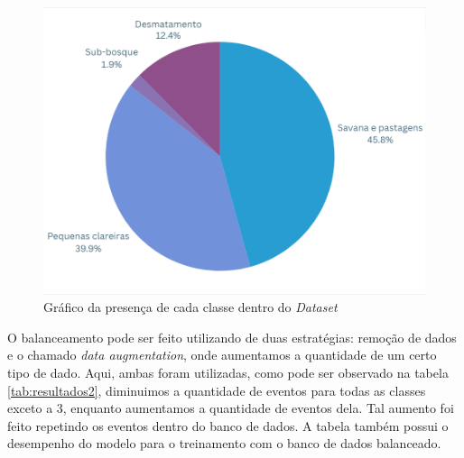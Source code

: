 \begin{figure}[H]
	\centering
	\begin{minipage}{0.9\linewidth}
		\centering
		\includegraphics[scale=0.6]{tg1/figuras/sem_balanceamento_pie.png}
		\caption{Gráfico da presença de cada classe dentro do \textit{Dataset}} \label{fig:lstm_sem_balanc}
	\end{minipage}
\end{figure}

O balanceamento pode ser feito utilizando de duas estratégias: remoção de dados e o chamado \textit{data augmentation}, onde aumentamos a quantidade de um certo tipo de dado. Aqui, ambas foram utilizadas, como pode ser observado na tabela \ref{tab:resultados2}, diminuimos a quantidade de eventos para todas as classes exceto a 3, enquanto aumentamos a quantidade de eventos dela. Tal aumento foi feito repetindo os eventos dentro do banco de dados. A tabela também possui o desempenho do modelo para o treinamento com o banco de dados balanceado.

